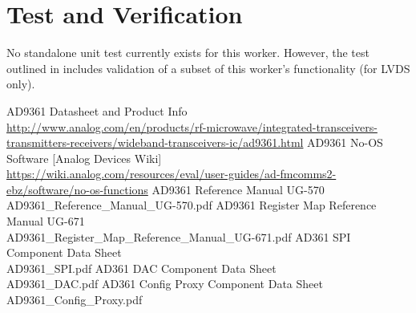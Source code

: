 \documentclass{article}
\begin{document}
\section*{Test and Verification}
No standalone unit test currently exists for this worker. However, the test outlined in \cite{dac_comp_datasheet} includes validation of a subset of this worker's functionality (for LVDS only).

\begin{thebibliography}{1}

 AD9361 Datasheet and Product Info \\
\url{http://www.analog.com/en/products/rf-microwave/integrated-transceivers-transmitters-receivers/wideband-transceivers-ic/ad9361.html}
 AD9361 No-OS Software [Analog Devices Wiki]\\
\url{https://wiki.analog.com/resources/eval/user-guides/ad-fmcomms2-ebz/software/no-os-functions}
 AD9361 Reference Manual UG-570\\
AD9361\_Reference\_Manual\_UG-570.pdf
 AD9361 Register Map Reference Manual UG-671\\
AD9361\_Register\_Map\_Reference\_Manual\_UG-671.pdf
 AD361 SPI Component Data Sheet \\AD9361\_SPI.pdf
 AD361 DAC Component Data Sheet \\AD9361\_DAC.pdf
 AD361 Config Proxy Component Data Sheet \\AD9361\_Config\_Proxy.pdf

\end{thebibliography}
\pagebreak
\landscape
\end{document}

